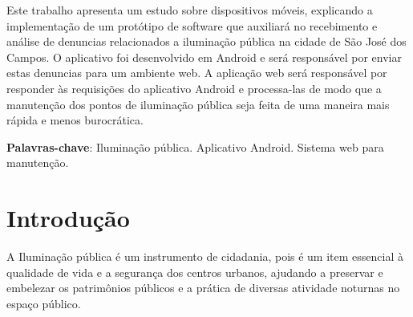 \documentclass[
	article,			%
	11pt,				%
	oneside,			%
	a4paper,			%
	english,			%
	brazil,				%
	sumario=tradicional
	]{abntex2}
\begin{document}

\frenchspacing


%
%
\maketitle

\begin{resumoumacoluna}
    Este trabalho apresenta um estudo sobre dispositivos móveis, explicando a
    implementação de um protótipo de software que auxiliará no recebimento e
    análise de denuncias relacionados a iluminação pública na cidade de
    São José dos Campos. O aplicativo foi desenvolvido em Android e será
    responsável por enviar estas denuncias para um ambiente web.
    A aplicação web será responsável por responder às requisições do aplicativo
    Android e processa-las de modo que a manutenção dos pontos de iluminação
    pública seja feita de uma maneira mais rápida e menos burocrática.
 \vspace{\onelineskip}

 \noindent
 \textbf{Palavras-chave}: Iluminação pública. Aplicativo Android. Sistema web para manutenção.
\end{resumoumacoluna}


\textual

\section*{Introdução}

A Iluminação pública é um instrumento de cidadania, pois é um item essencial
à qualidade de vida e a segurança dos centros urbanos, ajudando a preservar e
embelezar os patrimônios públicos e a prática de diversas atividade noturnas
no espaço público.
\end{document}
